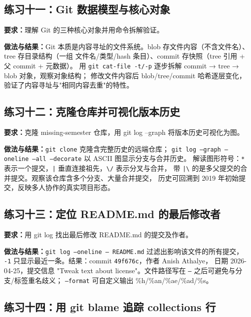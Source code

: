 \documentclass[UTF8]{ctexart}
\begin{document}
\subsection{练习十一：Git 数据模型与核心对象}

\noindent\textbf{要求：}理解 Git 的三种核心对象并用命令拆解验证。

\noindent\textbf{做法与结果：}Git 本质是内容寻址的文件系统。blob 存文件内容（不含文件名）、
tree 存目录结构（一组 文件名/类型/hash 条目）、commit 存快照（tree 引用 + 父 commit + 元数据）。
用 \texttt{git cat-file -t/-p} 逐步拆解 commit → tree → blob 对象，观察对象结构；
修改文件内容后 blob/tree/commit 哈希逐层变化，验证了内容寻址与"相同内容去重"的特性。

\subsection{练习十二：克隆仓库并可视化版本历史}

\noindent\textbf{要求：}克隆 missing-semester 仓库，用 git log --graph 将版本历史可视化为图。

\noindent\textbf{做法与结果：}\texttt{git clone} 克隆含完整历史的远端仓库；
\texttt{git log --graph --oneline --all --decorate} 以 ASCII 图显示分支与合并历史。
解读图形符号：\texttt{*} 表示一个提交，\texttt{|} 垂直连接祖先，\texttt{\textbackslash /} 表示分叉与合并，
带 \texttt{|\textbackslash} 的是多父提交的合并提交。观察该仓库含多个分支、大量合并提交，
历史可回溯到 2019 年初始提交，反映多人协作的真实项目形态。

\subsection{练习十三：定位 README.md 的最后修改者}

\noindent\textbf{要求：}用 git log 找出最后修改 README.md 的提交及作者。

\noindent\textbf{做法与结果：}\texttt{git log --oneline -- README.md} 过滤出影响该文件的所有提交，
\texttt{-1} 只显示最近一条。结果：commit \texttt{49f676c}，作者 Anish Athalye，
日期 2026-04-25，提交信息 "Tweak text about license"。文件路径写在 \texttt{--} 之后可避免与分支/标签重名歧义；
\texttt{--format} 可自定义输出 \%h/\%an/\%ae/\%ad/\%s。

\subsection{练习十四：用 git blame 追踪 collections 行}
\end{document}
